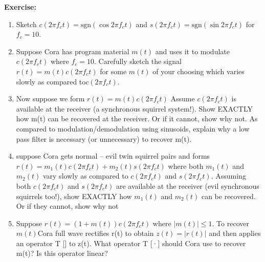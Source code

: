 \documentclass[12pt]{article}
\newenvironment*{exercise}[1][red]{
    \begin{tcolorbox}[
        parbox=false,
        colback=#1!5!white,
        colframe=#1!75!black,
        breakable
    ]}
    {\end{tcolorbox}}
\begin{document}
\begin{exercise}
    \textbf{Exercise:} 
    \begin{enumerate}
        \item Sketch $c(2\pi f_c t) = \text{sgn}(\cos 2\pi f_c t)$ and $s(2\pi f_c t) = \text{sgn}(\sin 2\pi f_c t)$ for $f_c = 10$. 
        
        \item Suppose Cora has program material $m(t)$ and uses it to modulate $c(2 \pi f_ct)$ where $f_c = 10$. Carefully sketch the signal $r(t) = m(t)c(2 \pi f_ct)$ for some $m(t)$ of your choosing which varies slowly as compared to$ c(2 \pi f_ct)$.
        
        \item Now suppose we form $r(t) = m(t)c(2\pi f_ct)$ Assume $c(2\pi f_ct)$ is available at the receiver (a synchronous squirrel system!). Show EXACTLY how m(t) can be recovered at the receiver. Or if it cannot, show why not. As compared to modulation/demodulation using sinusoids, explain why a low pass filter is necessary (or unnecessary) to recover m(t).
        
        \item suppose Cora gets normal – evil twin squirrel pairs and forms
        $r(t) = m_1(t)c(2\pi f_ct) + m_2(t)s(2\pi f_ct)$ where both $m_1(t)$ and $m_2(t)$ vary slowly as compared to $c(2\pi f_ct)$ and $s(2\pi f_ct)$. Assuming both $c(2\pi f_ct)$ and $s(2\pi f_ct)$ are available  at the receiver (evil synchronous squirrels too!), show EXACTLY how $m_1(t)$ and $m_2(t)$ can be recovered. Or if they cannot, show why not
        
        \item Suppose $r(t) = (1 + m(t))c(2\pi f_ct)$ where $|m(t)| \leq 1$. To recover $m(t) $Cora full wave rectifies r(t) to obtain $z(t) = |r(t)|$ and then applies an operator T [] to z(t). What operator T [·] should Cora use to recover m(t)? Is this operator linear?
    \end{enumerate}
\end{exercise}
\end{document}
